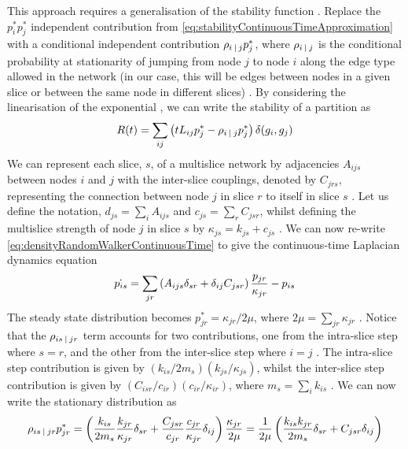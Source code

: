 This approach requires a generalisation of the stability function \cite{MRM+10}.
Replace the $p_{i}^{*} p_{j}^{*}$ independent contribution from \cref{eq:stabilityContinuousTimeApproximation} with a conditional independent contribution $\rho_{i \:\lvert\: j} p_{j}^{*}$, where $\rho_{i \:\lvert\: j}$ is the conditional probability at stationarity of jumping from node $j$ to node $i$ along the edge type allowed in the network (in our case, this will be edges between nodes in a given slice or between the same node in different slices) \cite{MRM+10}.
By considering the linearisation of the exponential \cite{MRM+10}, we can write the stability of a partition as
\begin{equation}
	\label{eq:multisliceStability}
	R(t) = \sum_{ij} \left( tL_{ij} p_{j}^{*} - \rho_{i \:\lvert\: j} p_{j}^{*} \right) \delta(g_{i},g_{j})
\end{equation}
We can represent each slice, $s$, of a multislice network by adjacencies $A_{ijs}$ between nodes $i$ and $j$ with the inter-slice couplings, denoted by $C_{jrs}$, representing the connection between node $j$ in slice $r$ to itself in slice $s$ \cite{MRM+10}.
Let us define the notation, $d_{js} = \sum_{i} A_{ijs}$ and $c_{js} = \sum_{r} C_{jsr}$, whilst defining the multislice strength of node $j$ in slice $s$ by $\kappa_{js} = k_{js} + c_{js}$ \cite{MRM+10}.
We can now re-write \cref{eq:densityRandomWalkerContinuousTime} to give the continuous-time Laplacian dynamics equation
\begin{equation}
	\label{eq:continuousTimeLaplacianDynamics}
	\dot{p_{is}} = \sum_{jr} \left( A_{ijs} \delta_{sr} +\delta_{ij} C_{jsr} \right) \frac{p_{jr}}{\kappa_{jr}} - p_{is}
\end{equation}
The steady state distribution becomes $p_{jr}^{*} = \kappa_{jr}/2\mu$, where $2\mu = \sum_{jr} \kappa_{jr}$ \cite{MRM+10}.
Notice that the $\rho_{is \:\lvert\: jr}$ term accounts for two contributions, one from the intra-slice step where $s=r$, and the other from the inter-slice step where $i=j$ \cite{MRM+10}.
The intra-slice step contribution is given by $\left( k_{is}/2m_{s} \right) \left( k_{js}/\kappa_{js} \right)$, whilst the inter-slice step contribution is given by $\left( C_{isr}/c_{ir} \right) \left( c_{ir}/\kappa_{ir} \right)$, where $m_{s} = \sum_{i} k_{is}$ \cite{MRM+10}.
We can now write the stationary distribution as
\begin{equation}
	\label{eq:continuousTimeLaplacianDynamicsStationaryDistribution}
	\rho_{is \:\lvert\: jr} p_{jr}^{*} = \left( \frac{k_{is}}{2m_{s}} \frac{k_{jr}}{\kappa_{jr}} \delta_{sr} + \frac{C_{jsr}}{c_{jr}} \frac{c_{jr}}{\kappa_{jr}} \delta_{ij} \right) \frac{\kappa_{jr}}{2\mu} = \frac{1}{2\mu} \left( \frac{k_{is}k_{jr}}{2m_{s}} \delta_{sr} + C_{jsr} \delta_{ij} \right)
\end{equation}
